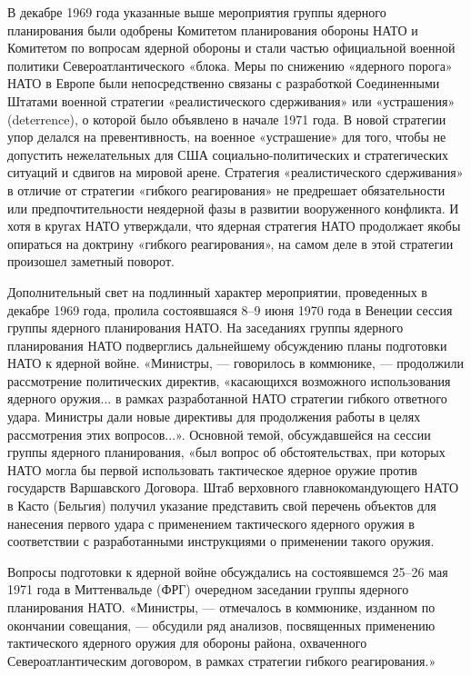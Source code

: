 \documentclass[12pt, a4paper, openany]{book}
\begin{document}
	В декабре 1969 года указанные выше мероприятия группы ядерного планирования были одобрены Комитетом планирования обороны НАТО и Комитетом по вопросам ядерной обороны и стали частью официальной военной политики Североатлантического «блока. Меры по снижению «ядерного порога» НАТО в Европе были непосредственно связаны с разработкой Соединенными Штатами военной стратегии «реалистического сдерживания» или «устрашения» (deterrence), о которой было объявлено в начале 1971 года. В новой стратегии упор делался на превентивность, на военное «устрашение» для того, чтобы не допустить нежелательных для США социально-политических и стратегических ситуаций и сдвигов на мировой арене. Стратегия «реалистического сдерживания» в отличие от стратегии «гибкого реагирования» не предрешает обязательности или предпочтительности неядерной фазы в развитии вооруженного конфликта. И хотя в кругах НАТО утверждали, что ядерная стратегия НАТО продолжает якобы опираться на доктрину «гибкого реагирования», на самом деле в этой стратегии произошел заметный поворот.
	
	Дополнительный свет на подлинный характер мероприятии, проведенных в декабре 1969 года, пролила состоявшаяся 8–9 июня 1970 года в Венеции сессия группы ядерного планирования НАТО. На заседаниях группы ядерного планирования НАТО подверглись дальнейшему обсуждению планы подготовки НАТО к ядерной войне. «Министры, — говорилось в коммюнике, — продолжили рассмотрение политических директив, «касающихся возможного использования ядерного оружия... в рамках разработанной НАТО стратегии гибкого ответного удара. Министры дали новые директивы для продолжения работы в целях рассмотрения этих вопросов...». Основной темой, обсуждавшейся на сессии группы ядерного планирования, «был вопрос об обстоятельствах, при которых НАТО могла бы первой использовать тактическое ядерное оружие против государств Варшавского Договора. Штаб верховного главнокомандующего НАТО в Касто (Бельгия) получил указание представить свой перечень объектов для нанесения первого удара с применением тактического ядерного оружия в соответствии с разработанными инструкциями о применении такого оружия.
	
	Вопросы подготовки к ядерной войне обсуждались на состоявшемся 25–26 мая 1971 года в Миттенвальде (ФРГ) очередном заседании группы ядерного планирования НАТО. «Министры, — отмечалось в коммюнике, изданном по окончании совещания, — обсудили ряд анализов, посвященных применению тактического ядерного оружия для обороны района, охваченного Североатлантическим договором, в рамках стратегии гибкого реагирования.»
	
\end{document}
